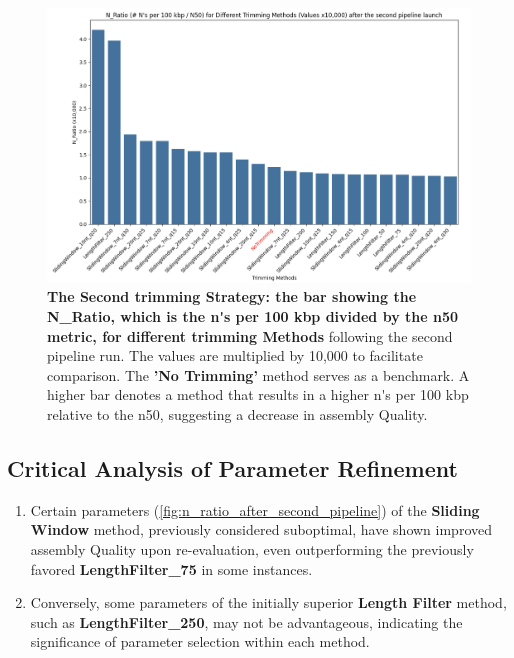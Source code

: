 \begin{figure}[H]
\centering
\includegraphics[width=\linewidth]{resources/images/n_ratio_2.png}
\caption{\textbf{The Second \gls{trimming} Strategy: the \gls{bar} showing the N\_Ratio, which is the \gls{n's per 100 kbp} divided by the \gls{n50} metric, for different \gls{trimming} Methods} following the second pipeline run. The values are multiplied by 10,000 to facilitate comparison. The \textbf{'No Trimming'} method serves as a benchmark. A higher bar denotes a method that results in a higher \gls{n's per 100 kbp} relative to the \gls{n50}, suggesting a decrease in \gls{assembly} Quality.}
\label{fig:n_ratio_after_second_pipeline}
\end{figure}



\subsection{Critical Analysis of Parameter Refinement}

\begin{enumerate}
  \item Certain parameters (\autoref{fig:n_ratio_after_second_pipeline}) of the \textbf{Sliding Window} method, previously considered suboptimal, have shown improved \gls{assembly} Quality upon re-evaluation, even outperforming the previously favored \textbf{LengthFilter\_75} in some instances.
  \item Conversely, some parameters of the initially superior \textbf{Length Filter} method, such as \textbf{LengthFilter\_250}, may not be advantageous, indicating the significance of parameter selection within each method.
\end{enumerate}

